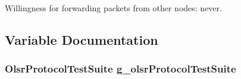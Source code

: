 Willingness for forwarding packets from other nodes\+: never. 



\subsection{Variable Documentation}
\subsubsection[{\texorpdfstring{g\+\_\+olsr\+Protocol\+Test\+Suite}{g_olsrProtocolTestSuite}}]{\setlength{\rightskip}{0pt plus 5cm} {\bf Olsr\+Protocol\+Test\+Suite}  g\+\_\+olsr\+Protocol\+Test\+Suite\hspace{0.3cm}{\ttfamily [static]}}\hypertarget{olsr-routing-protocol-test-suite_8cc_ace56e07d606bbc9a0f942cda0d61bdf2}{}\label{olsr-routing-protocol-test-suite_8cc_ace56e07d606bbc9a0f942cda0d61bdf2}
